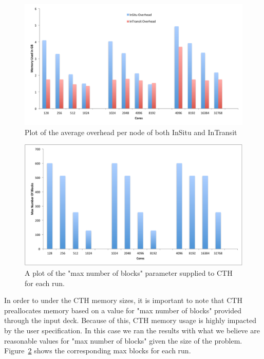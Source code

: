 \begin{figure}[htb]
  \centering
  \includegraphics[width=\linewidth]{figures/MemoryUsageCompare.pdf}
  \caption{Plot of the average overhead per node of both InSitu and InTransit}
  \label{fig:MemoryCompare}
\end{figure}

\begin{figure}[htb]
  \centering
  \includegraphics[width=\linewidth]{figures/MaxNumberOfBlocks.pdf}
  \caption{A plot of the "max number of blocks" parameter supplied to CTH for each run.}
  \label{fig:MaxBlocks}
\end{figure}

In order to under the CTH memory sizes, it is important to note that CTH
preallocates memory based on a value for "max number of blocks" provided
through the input deck.  Because of this, CTH memory usage is highly impacted
by the user specification.  In this case we ran the results with what we
believe are reasonable values for "max number of blocks" given the size of the
problem.  Figure~\ref{fig:MaxBlocks} shows the corresponding max blocks for
each run.



